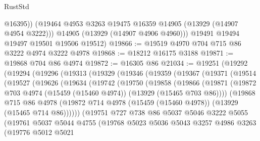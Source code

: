 \begin{lexlean}{RustStd}
\begin{coremodule}
            @16395))
        (@19464 @4953 @3263 @19475 @16359 @14905 (@13929 (@14907 @4954 @3222)))
        @14905
        (@13929 (@14907 @4906 @4960)))
      @19491
      @19494
      @19497
      @19501
      @19506
      @19512)
@19866 := @19519 @4970 @704 @715 @86 @3222 @4974 @3222 @4978
@19868 := @18212 @16175 @3188
@19871 := @19868 @704 @86 @4974
@19872 := @16305 @86
@21034 := @19251
    (@19292
      (@19294
        (@19296
          (@19313
            (@19329
              (@19346
                (@19359
                  (@19367
                    (@19371
                      (@19514
                        (@19527
                          (@19626
                            (@19634
                              (@19742
                                (@19750
                                  (@19858
                                    (@19866
                                      (@19871
                                        (@19872
                                          @703
                                          @4974
                                          (@15459 (@15460 @4974))
                                          (@13929 (@15465 @703 @86))))
                                      (@19868
                                        @715
                                        @86
                                        @4978
                                        (@19872
                                          @714
                                          @4978
                                          (@15459 (@15460 @4978))
                                          (@13929 (@15465 @714 @86))))))
                                  (@19751
                                    @727
                                    @738
                                    @86
                                    @5037
                                    @5046
                                    @3222
                                    @5055
                                    (@19761
                                      @5037
                                      @5044
                                      @4755
                                      (@19768
                                        @5023
                                        @5036
                                        @5043
                                        @3257
                                        @4986
                                        @3263
                                        (@19776
                                          @5012
                                          @5021

\end{coremodule}
\end{lexlean}
